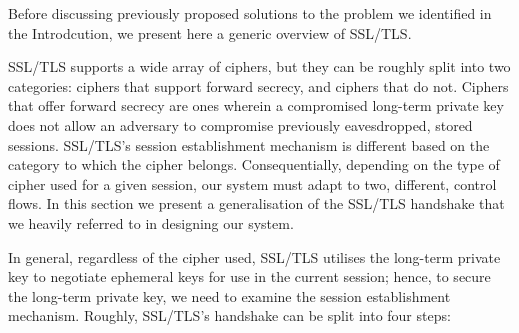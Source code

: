 \documentclass[../main.tex]{subfiles}
\begin{document}
\label{sec:ssloverview}
Before discussing previously proposed solutions to the problem we
identified in the Introdcution, we present here a generic overview of
SSL/TLS.

SSL/TLS supports a wide array of ciphers, but they can be roughly
split into two categories: ciphers that support forward secrecy, and
ciphers that do not. Ciphers that offer forward secrecy are ones
wherein a compromised long-term private key does not allow an
adversary to compromise previously eavesdropped, stored
sessions. SSL/TLS's session establishment mechanism is different based
on the category to which the cipher belongs. Consequentially,
depending on the type of cipher used for a given session, our system
must adapt to two, different, control flows. In this section we present
a generalisation of the SSL/TLS handshake that we heavily referred
to in designing our system.

In general, regardless of the cipher used, SSL/TLS utilises
the long-term private key to negotiate ephemeral keys for use in the
current session; hence, to secure the long-term private key, we need
to examine the session establishment mechanism. Roughly, SSL/TLS's
handshake can be split into four steps:
\end{document}
